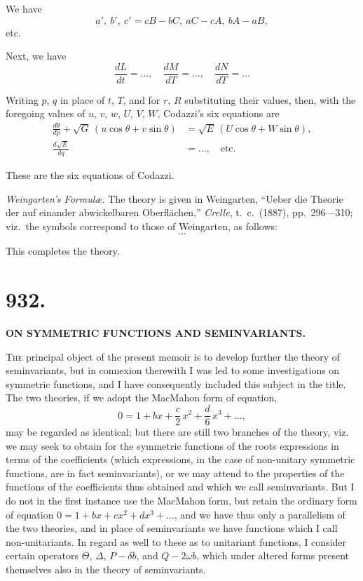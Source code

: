 \documentclass[11pt,a4paper]{article}
\newcommand{\paper}[2]{\section*{#1.} \begin{center}\textbf{#2}\end{center}}
\begin{document}
We have
\[
a',\ b',\ c' = cB - bC,\ aC - cA,\ bA - aB,
\]
etc.

Next, we have
\[
\frac{dL}{dt} = \ldots, \quad \frac{dM}{dT} = \ldots, \quad \frac{dN}{dT} = \ldots
\]

Writing $p$, $q$ in place of $t$, $T$, and for $r$, $R$ substituting their values, then, with
the foregoing values of $u$, $v$, $w$, $U$, $V$, $W$, Codazzi's six equations are
\begin{align*}
\frac{d\theta}{dp} + \sqrt{G}\,(u\cos\theta + v\sin\theta) &= \sqrt{E}\,(U\cos\theta + W\sin\theta),\\
\frac{d\sqrt{E}}{dq} &= \ldots, \quad \text{etc.}
\end{align*}

These are the six equations of Codazzi.

\textit{Weingarten's Formul\ae.} The theory is given in Weingarten,
``Ueber die Theorie der auf einander abwickelbaren Oberfl\"achen,''
\textit{Crelle}, t.\ c.\ (1887), pp.\ 296---310; viz.\ the symbols correspond to those of
Weingarten, as follows:
\[
\ldots
\]

This completes the theory.

\newpage
\paper{932}{ON SYMMETRIC FUNCTIONS AND SEMINVARIANTS.}

\begin{flushright}
\end{flushright}

\textsc{The} principal object of the present memoir is to develop further the theory of
seminvariants, but in connexion therewith I was led to some investigations on
symmetric functions, and I have consequently included this subject in the title. The
two theories, if we adopt the MacMahon form of equation,
\[
0 = 1 + bx + \frac{c}{2}\,x^2 + \frac{d}{6}\,x^3 + \ldots,
\]
may be regarded as identical; but there are still two branches of the theory, viz.
we may seek to obtain for the symmetric functions of the roots expressions in terms
of the coefficients (which expressions, in the case of non-unitary symmetric functions,
are in fact seminvariants), or we may attend to the properties of the functions of
the coefficients thus obtained and which we call seminvariants. But I do not in
the first instance use the MacMahon form, but retain the ordinary form of equation
$0 = 1 + bx + cx^2 + dx^3 + \ldots$, and we have thus only a parallelism of the two theories,
and in place of seminvariants we have functions which I call non-unitariants. In
regard as well to these as to unitariant functions, I consider certain operators
$\Theta$, $\Delta$, $P - \delta b$, and $Q - 2\omega b$, which under altered forms present themselves also in
the theory of seminvariants.
\end{document}
